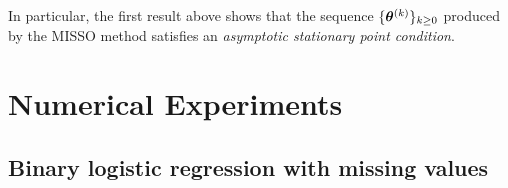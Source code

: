 \documentclass[11pt]{article}
\theoremstyle{t}
\begin{document}
\vspace{-0.08in}
In particular, the first result above shows that the sequence $\{ \hp{k} \}_{k \geq 0}$ produced by the MISSO method satisfies an \emph{asymptotic stationary point condition}.

\vspace{-0.05in}
\section{Numerical Experiments}\label{sec:numerical}
\vspace{-0.05in}

\subsection{Binary logistic regression with missing values}\label{logisticreg}

\vspace{-0.05in}
\end{document}

